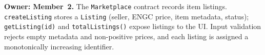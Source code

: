 \textbf{Owner: Member~2.} The \texttt{Marketplace} contract records item listings. \texttt{createListing} stores a \texttt{Listing} (seller, ENGC price, item metadata, status); \texttt{getListing(id)} and \texttt{totalListings()} expose listings to the UI. Input validation rejects empty metadata and non-positive prices, and each listing is assigned a monotonically increasing identifier.
